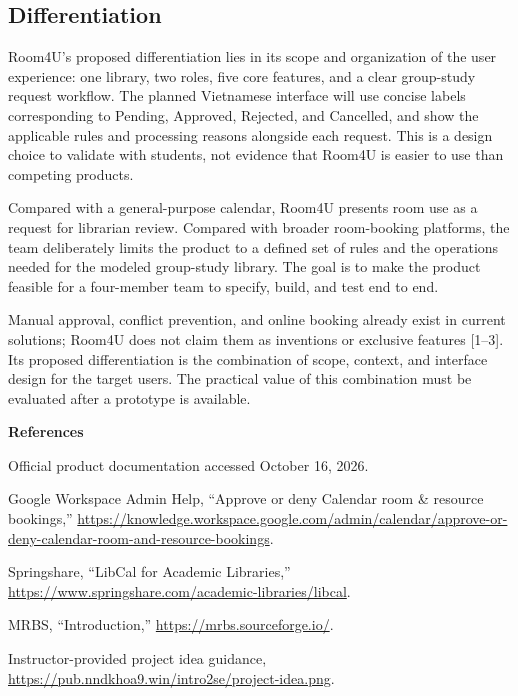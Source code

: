 \subsection{Differentiation}
Room4U's proposed differentiation lies in its scope and organization of the user experience: one library, two roles, five core features, and a clear group-study request workflow. The planned Vietnamese interface will use concise labels corresponding to Pending, Approved, Rejected, and Cancelled, and show the applicable rules and processing reasons alongside each request. This is a design choice to validate with students, not evidence that Room4U is easier to use than competing products.

Compared with a general-purpose calendar, Room4U presents room use as a request for librarian review. Compared with broader room-booking platforms, the team deliberately limits the product to a defined set of rules and the operations needed for the modeled group-study library. The goal is to make the product feasible for a four-member team to specify, build, and test end to end.

Manual approval, conflict prevention, and online booking already exist in current solutions; Room4U does not claim them as inventions or exclusive features [1--3]. Its proposed differentiation is the combination of scope, context, and interface design for the target users. The practical value of this combination must be evaluated after a prototype is available.

\noindent\textbf{References}\par
Official product documentation accessed October 16, 2026.

\begin{enumerate}[label={[\arabic*]}]
  \item Google Workspace Admin Help, ``Approve or deny Calendar room \& resource bookings,'' \url{https://knowledge.workspace.google.com/admin/calendar/approve-or-deny-calendar-room-and-resource-bookings}.
  \item Springshare, ``LibCal for Academic Libraries,'' \url{https://www.springshare.com/academic-libraries/libcal}.
  \item MRBS, ``Introduction,'' \url{https://mrbs.sourceforge.io/}.
  \item Instructor-provided project idea guidance, \url{https://pub.nndkhoa9.win/intro2se/project-idea.png}.
\end{enumerate}

\clearpage